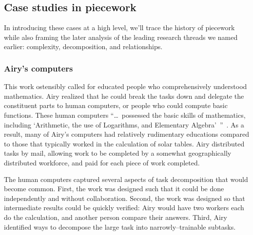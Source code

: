 \documentclass[pn4226]{subfiles}
\begin{document}
\subsection{Case studies in piecework}
In introducing these cases at a high level,
we'll trace the history of piecework
while also framing the later analysis of the leading research threads we named earlier:
complexity, decomposition, and relationships.

\subsubsection{Airy's computers}

\begin{comment}
What did I pull from the threads that are related to industrial and railroad workers (i.e. 1920 onward?)

- Airy and his human computers were great:
  - quickly verifiable
  - independent tasks (could be checked without the whole product)
  - narrowly trainable

\end{comment}

This work ostensibly called for educated people who comprehensively understood mathematics.
Airy realized that he could break the tasks down and delegate the constituent parts
to human computers, or people who could compute basic functions.
These human computers ``\dots~possessed the basic skills of mathematics,
including `Arithmetic, the use of Logarithms, and Elementary Algebra'~''~\cite{grier2013computers}.
As a result, many of Airy's computers had relatively rudimentary educations
compared to those that typically worked in the calculation of solar tables.
Airy distributed tasks by mail,
allowing work to be completed by a somewhat geographically distributed workforce,
and paid for each piece of work completed.

The human computers captured several aspects of task decomposition that would become common. 
First, the work was designed such that it could be done independently and without collaboration. 
Second, the work was designed so that intermediate results could be quickly verified: Airy would have two workers each do the calculation, and another person compare their answers.
Third, Airy identified ways to decompose the large task into narrowly--trainable subtasks.
\end{document}
